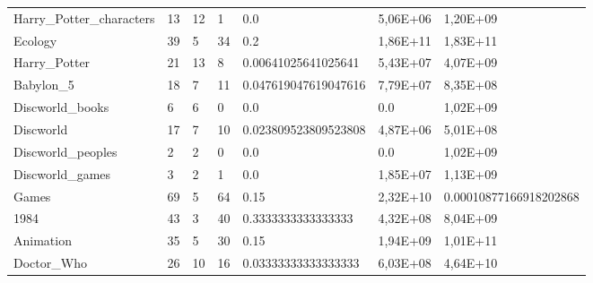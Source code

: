 \begin{longtable}{@{}lllllll@{}}
Harry\_Potter\_characters & 13 & 12 & 1 & 0.0 & 5,06E+06 & 1,20E+09 \\
Ecology & 39 & 5 & 34 & 0.2 & 1,86E+11 & 1,83E+11 \\
Harry\_Potter & 21 & 13 & 8 & 0.00641025641025641 & 5,43E+07 & 4,07E+09 \\
Babylon\_5 & 18 & 7 & 11 & 0.047619047619047616 & 7,79E+07 & 8,35E+08 \\
Discworld\_books & 6 & 6 & 0 & 0.0 & 0.0 & 1,02E+09 \\
Discworld & 17 & 7 & 10 & 0.023809523809523808 & 4,87E+06 & 5,01E+08 \\
Discworld\_peoples & 2 & 2 & 0 & 0.0 & 0.0 & 1,02E+09 \\
Discworld\_games & 3 & 2 & 1 & 0.0 & 1,85E+07 & 1,13E+09 \\
Games & 69 & 5 & 64 & 0.15 & 2,32E+10 & 0.00010877166918202868 \\
1984 & 43 & 3 & 40 & 0.3333333333333333 & 4,32E+08 & 8,04E+09 \\
Animation & 35 & 5 & 30 & 0.15 & 1,94E+09 & 1,01E+11 \\
Doctor\_Who & 26 & 10 & 16 & 0.03333333333333333 & 6,03E+08 & 4,64E+10 \\* \bottomrule
\end{longtable}